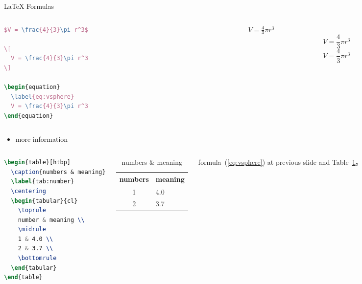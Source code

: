 \documentclass{beamer}
\begin{document}
\begin{frame}[fragile]{\LaTeX{} Formulas}
    \begin{columns}
        \begin{column}{.55\textwidth}
\begin{lstlisting}[language=TeX]
$V = \frac{4}{3}\pi r^3$

\[
  V = \frac{4}{3}\pi r^3
\]

\begin{equation}
  \label{eq:vsphere}
  V = \frac{4}{3}\pi r^3
\end{equation}
\end{lstlisting}
        \end{column}
        \begin{column}{.4\textwidth}
            $V = \frac{4}{3}\pi r^3$
            \[
                V = \frac{4}{3}\pi r^3
            \]
            \begin{equation}
                \label{eq:vsphere}
                V = \frac{4}{3}\pi r^3
            \end{equation}
        \end{column}
    \end{columns}
    \begin{itemize}
        \item more information \href{https://ja.overleaf.com/learn/latex/Mathematical_expressions}{\color{purple}{here}}
    \end{itemize}
\end{frame}

\begin{frame}[fragile]
    \begin{columns}
\begin{lstlisting}[language=TeX]
\begin{table}[htbp]
  \caption{numbers & meaning}
  \label{tab:number}
  \centering
  \begin{tabular}{cl}
    \toprule
    number & meaning \\
    \midrule
    1 & 4.0 \\
    2 & 3.7 \\
    \bottomrule
  \end{tabular}
\end{table}
\end{lstlisting}
        \begin{table}[htpb]
            \centering
            \caption{numbers \& meaning}
            \label{tab:number}
            \begin{tabular}{cl}\toprule
                numbers & meaning \\\midrule
                1 & 4.0\\
                2 & 3.7\\\bottomrule
            \end{tabular}
        \end{table}
        \normalsize formula~(\ref{eq:vsphere}) at previous slide and Table~\ref{tab:number}。
    \end{columns}
\end{frame}
\end{document}

